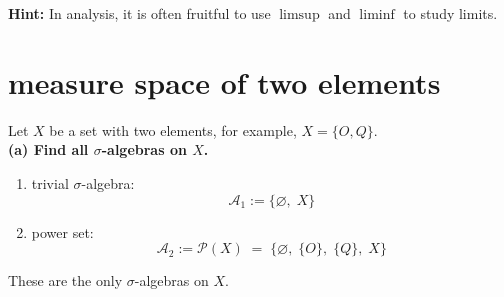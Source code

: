 \documentclass[lang=cn,11pt]{elegantbook}
\begin{document}
\noindent \textbf{Hint:} In analysis, it is often fruitful to use \(\limsup\) and \(\liminf\) to study limits.\\

\section{measure space of two elements}
\noindent Let \(X\) be a set with two elements, for example, \(X = \{O, Q\}\).\\
\noindent \textbf{(a) Find all \(\sigma\)-algebras on \(X\).}
\begin{solution}
    \begin{enumerate}
    \item trivial \(\sigma\)-algebra:\[
     \mathcal{A}_1 :=\{\varnothing,\; X\}
   \]
   \item power set:
   \[
     \mathcal{A}_2 := \mathcal{P}(X)
     \;=\;\{\varnothing,\;\{O\},\;\{Q\},\;X\}
   \]
\end{enumerate}
These are the only $\sigma$-algebras on $X$.\\\\
\end{solution}
\end{document}
